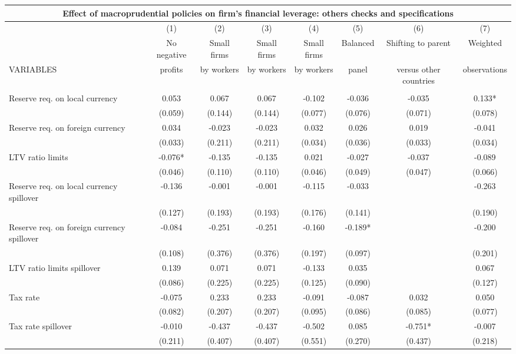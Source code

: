 \begin{tabular}{lccccccc}
\multicolumn{8}{c}{Effect of macroprudential policies on firm's financial leverage: others checks and specifications} \\ \hline
 & (1) & (2) & (3) & (4) & (5) & (6) & (7) \\
 & No negative & Small firms & Small firms & Small firms & Balanced & Shifting to parent & Weighted \\
VARIABLES & profits & by workers & by workers & by workers & panel & versus other countries & observations \\ \hline
 &  &  &  &  &  &  &  \\
Reserve req. on local currency & 0.053 & 0.067 & 0.067 & -0.102 & -0.036 & -0.035 & 0.133* \\
 & (0.059) & (0.144) & (0.144) & (0.077) & (0.076) & (0.071) & (0.078) \\
Reserve req. on foreign currency & 0.034 & -0.023 & -0.023 & 0.032 & 0.026 & 0.019 & -0.041 \\
 & (0.033) & (0.211) & (0.211) & (0.034) & (0.036) & (0.033) & (0.034) \\
LTV ratio limits & -0.076* & -0.135 & -0.135 & 0.021 & -0.027 & -0.037 & -0.089 \\
 & (0.046) & (0.110) & (0.110) & (0.046) & (0.049) & (0.047) & (0.066) \\
Reserve req. on local currency spillover & -0.136 & -0.001 & -0.001 & -0.115 & -0.033 &  & -0.263 \\
 & (0.127) & (0.193) & (0.193) & (0.176) & (0.141) &  & (0.190) \\
Reserve req. on foreign currency spillover & -0.084 & -0.251 & -0.251 & -0.160 & -0.189* &  & -0.200 \\
 & (0.108) & (0.376) & (0.376) & (0.197) & (0.097) &  & (0.201) \\
LTV ratio limits spillover & 0.139 & 0.071 & 0.071 & -0.133 & 0.035 &  & 0.067 \\
 & (0.086) & (0.225) & (0.225) & (0.125) & (0.090) &  & (0.127) \\
Tax rate & -0.075 & 0.233 & 0.233 & -0.091 & -0.087 & 0.032 & 0.050 \\
 & (0.082) & (0.207) & (0.207) & (0.095) & (0.086) & (0.085) & (0.077) \\
Tax rate spillover & -0.010 & -0.437 & -0.437 & -0.502 & 0.085 & -0.751* & -0.007 \\
 & (0.211) & (0.407) & (0.407) & (0.551) & (0.270) & (0.437) & (0.218) \\

\end{tabular}
